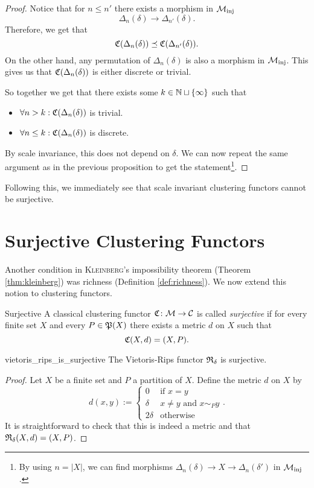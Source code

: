 \begin{proof}   
    Notice that for $n \le n'$ there exists a morphism in $\inj$
    $$
    \Delta_n(\delta) \longrightarrow \Delta_{n'}(\delta).
    $$
    Therefore, we get that
    $$
    \Cf(\Delta_n(\delta)) \refines \Cf(\Delta_{n'}(\delta)).
    $$
    On the other hand, any permutation of $\Delta_n(\delta)$ is also a morphism in $\inj$. This gives us that $\Cf(\Delta_n(\delta))$ is either discrete or trivial.

    So together we get that there exists some $k \in \N \sqcup \{\infty\}$ such that
    \begin{itemize}
        \item $\forall n > k: \Cf(\Delta_n(\delta))$ is trivial.
        \item $\forall n \le k: \Cf(\Delta_n(\delta))$ is discrete.
    \end{itemize}
    By scale invariance, this does not depend on $\delta$. We can now repeat the same argument as in the previous proposition to get the statement\footnote{By using $n = |X|$, we can find morphisms $\Delta_n(\delta) \to X \to \Delta_n(\delta')$ in $\inj$.}.
\end{proof}

Following this, we immediately see that scale invariant clustering functors cannot be surjective.

\section{Surjective Clustering Functors}

Another condition in \textsc{Kleinberg}'s impossibility theorem (Theorem \ref{thm:kleinberg}) was richness (Definition \ref{def:richness}). We now extend this notion to clustering functors.

\begin{definition}{Surjective}{}
    A classical clustering functor $\Cf\colon \M \to \C$ is called \emph{surjective} if for every finite set $X$ and every $P \in \P(X)$ there exists a metric $d$ on $X$ such that
    \begin{equation*}
        \Cf(X,d) = (X,P).
    \end{equation*}
\end{definition}

\begin{proposition}{\cite[Rem.~6.1]{Carlsson2010}}{vietoris_rips_is_surjective}
    The Vietoris-Rips functor $\Rf_\delta$ is surjective.
\end{proposition}
\begin{proof}
Let $X$ be a finite set and $P$ a partition of $X$. Define the metric $d$ on $X$ by
\begin{equation*}
    d(x,y) := \begin{cases}
        0 & \text{if } x = y\\
        \delta & x \neq y \text{ and } x \sim_P y\\
        2\delta & \text{otherwise}
    \end{cases}.
\end{equation*}
It is straightforward to check that this is indeed a metric and that $\Rf_\delta(X,d) = (X,P)$.
\end{proof}

